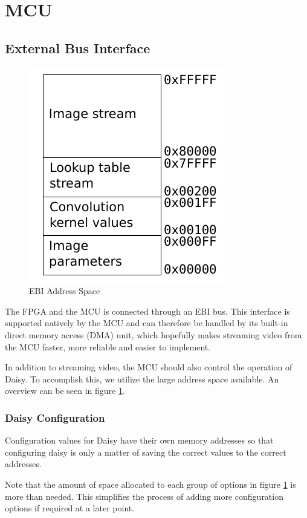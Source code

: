 \section{MCU}

\subsection{External Bus Interface}
\begin{figure}
    \centering
    \includegraphics[]{img/EbiAddressSpace.pdf}
    \caption{EBI Address Space}
    \label{fig:EbiAddressSpace}
\end{figure}
The FPGA and the MCU is connected through an EBI bus.
This interface is supported natively by the MCU and can therefore be handled by its built-in direct memory access (DMA) unit, which hopefully makes streaming video from the MCU faster, more reliable and easier to implement.

In addition to streaming video, the MCU should also control the operation of Daisy.
To accomplish this, we utilize the large address space available.
An overview can be seen in figure \ref{fig:EbiAddressSpace}.

\subsubsection{Daisy Configuration}
Configuration values for Daisy have their own memory addresses so that configuring daisy is only a matter of saving the correct values to the correct addresses.

Note that the amount of space allocated to each group of options in figure \ref{fig:EbiAddressSpace} is more than needed.
This simplifies the process of adding more configuration options if required at a later point.

